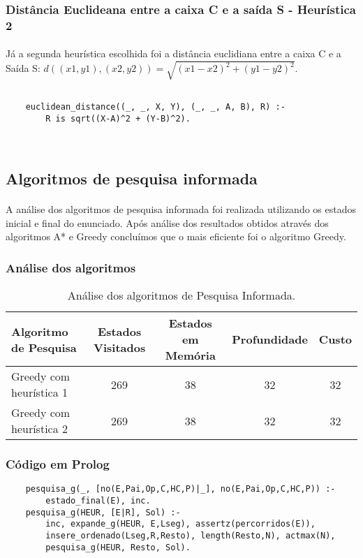 \documentclass{article}
\begin{document}
\subsubsection{Distância Euclideana entre a caixa C e a saída S - Heurística 2}
\paragraph{} Já a segunda heurística escolhida foi a distância euclidiana entre a caixa C e a Saída S: $d((x1, y1), (x2, y2)) = \sqrt{(x1-x2)^2 + (y1-y2)^2}$.

\begin{verbatim}

    euclidean_distance((_, _, X, Y), (_, _, A, B), R) :- 
        R is sqrt((X-A)^2 + (Y-B)^2).

        
\end{verbatim}


\subsection{Algoritmos de pesquisa informada}
\paragraph{} A análise dos algoritmos de pesquisa informada foi realizada utilizando os estados inicial e final do enunciado. Após análise dos resultados obtidos através dos algoritmos A* e Greedy concluímos que o mais eficiente foi o algoritmo Greedy.
\subsubsection{Análise dos algoritmos}

\begin{table}[h]
\centering
\begin{tabular}{l|c|c|c|c}
Algoritmo de Pesquisa & Estados Visitados & Estados em Memória & Profundidade & Custo \\\hline
Greedy com heurística 1 & 269 & 38 & 32 & 32 \\\hline
Greedy com heurística 2 & 269 & 38 & 32 & 32
\end{tabular}
\caption{\label{tab:pni}Análise dos algoritmos de Pesquisa Informada.}
\end{table}

\subsubsection{Código em Prolog}
\begin{verbatim}
    pesquisa_g(_, [no(E,Pai,Op,C,HC,P)|_], no(E,Pai,Op,C,HC,P)) :- 
        estado_final(E), inc.
    pesquisa_g(HEUR, [E|R], Sol) :- 
        inc, expande_g(HEUR, E,Lseg), assertz(percorridos(E)),
        insere_ordenado(Lseg,R,Resto), length(Resto,N), actmax(N),
        pesquisa_g(HEUR, Resto, Sol).
\end{verbatim}
 
\end{document}

